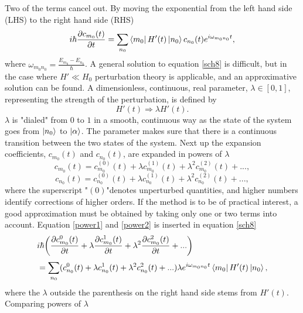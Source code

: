 Two of the terms cancel out. By moving the exponential from the left hand side (LHS) to the right hand side (RHS)
\begin{equation}
	i\hbar\frac{\partial c_{m_0}(t)}{\partial t}=\sum_{n_0}^{}\bra{m_0}H'(t)\ket{n_0}c_{n_0}(t)e^{i\omega_{m_0n_0}t},
	\label{sch8}
\end{equation} 
where $\omega_{m_0n_0}=\frac{E_{m_0}-E_{n_0}}{\hbar}$. A general solution to equation \eqref{sch8} is difficult, but in the case where $H'\ll H_0$ perturbation theory is applicable, and an approximative solution can be found. A dimensionless, continuous, real parameter, $\lambda \in[0,1]$, representing the strength of the perturbation, is defined by
\begin{equation}
	H'(t)\Rightarrow\lambda H'(t).
\end{equation} 
$\lambda$ is "dialed" from $0$ to $1$ in a smooth, continuous way as the state of the system goes from $\ket{n_0}$ to $\ket{\alpha}$. The parameter makes sure that there is a continuous transition between the two states of the system. Next up the expansion coefficients, $c_{m_0}(t)$ and $c_{n_0}(t)$, are expanded in powers of $\lambda$
\begin{equation}
	c_{m_0}(t)=c^{(0)}_{m_0}(t)+\lambda c^{(1)}_{m_0}(t)+\lambda^2c^{(2)}_{m_0}(t)+...,
	\label{power1}
\end{equation} 
\begin{equation}
	c_{n_0}(t)=c^{(0)}_{n_0}(t)+\lambda c^{(1)}_{n_0}(t)+\lambda^2c^{(2)}_{n_0}(t)+...,
	\label{power2}
\end{equation} 
where the superscript "${(0)}$"denotes unperturbed quantities, and higher numbers identify corrections of higher orders. If the method is to be of practical interest, a good approximation must be obtained by taking only one or two terms into account. Equation \eqref{power1} and \eqref{power2} is inserted in equation \eqref{sch8}
\begin{equation}
	\begin{split}
		&i\hbar\bigg(\frac{\partial c^0_{m_0}(t)}{\partial t}+\lambda\frac{\partial c^1_{m_0}(t)}{\partial t}+\lambda^2\frac{\partial c^2_{m_0}(t)}{\partial t}+...\bigg)\\
		& =\sum_{n_0}^{}(c^0_{n_0}(t)+\lambda c^1_{n_0}(t)+\lambda^2c^2_{n_0}(t)+...)\lambda e^{i\omega_{m_0n_0}t}\bra{m_0}H'(t)\ket{n_0},
	\end{split}
	\label{sch9}
\end{equation} 
\normalsize
where the $\lambda$ outside the parenthesis on the right hand side stems from $H'(t)$. Comparing powers of $\lambda$
